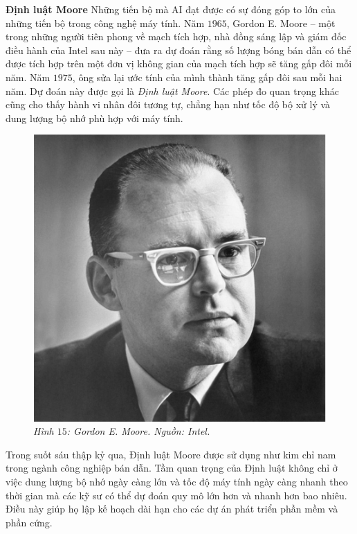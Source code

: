 \begin{multicols}{2}
	\vskip 0.1cm
	\textbf{\color{cackithi}Định luật Moore}
	\vskip 0.1cm
	Những tiến bộ mà AI đạt được có sự đóng góp to lớn của những tiến bộ trong công nghệ máy tính. 
	\vskip 0.1cm
	Năm $1965$, Gordon E. Moore -- một trong những người tiên phong về mạch tích hợp, nhà đồng sáng lập và giám đốc điều hành của Intel sau này -- đưa ra dự đoán rằng số lượng bóng bán dẫn có thể được tích hợp trên một đơn vị không gian của mạch tích hợp sẽ tăng gấp đôi mỗi năm. Năm $1975$, ông sửa lại ước tính của mình thành tăng gấp đôi sau mỗi hai năm. Dự đoán này được gọi là \textit{Định luật Moore}. Các phép đo quan trọng khác cũng cho thấy hành vi nhân đôi tương tự, chẳng hạn như tốc độ bộ xử lý và dung lượng bộ nhớ phù hợp với máy tính. 
	\begin{figure}[H]
		\vspace*{-5pt}
		\centering
		\captionsetup{labelformat= empty, justification=centering}
		\includegraphics[width= 1\linewidth]{Gordon_E._Moore.jpg}
		\caption{\small\textit{\color{cackithi}Hình $15$: Gordon E. Moore. Nguồn: Intel.}}
		\vspace*{-10pt}
	\end{figure}
	Trong suốt sáu thập kỷ qua, Định luật Moore được sử dụng như kim chỉ nam trong ngành công nghiệp bán dẫn. Tầm quan trọng của Định luật không chỉ ở việc dung lượng bộ nhớ ngày càng lớn và tốc độ máy tính ngày càng nhanh theo thời gian mà các kỹ sư có thể dự đoán quy mô lớn hơn và nhanh hơn bao nhiêu. Điều này giúp họ lập kế hoạch dài hạn cho các dự án phát triển phần mềm và phần cứng. 

\end{multicols}
